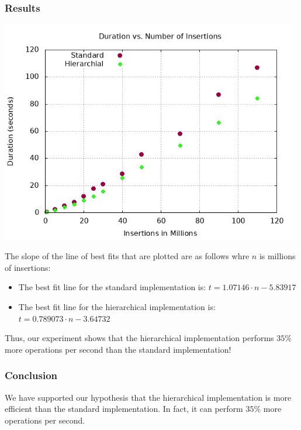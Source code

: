 \subsubsection{Results}
\begin{center}
    \includegraphics[width=13cm]{plots/scale-nm.png}
\end{center}
The slope of the line of best fits that are plotted are as follows whre $n$ is millions of insertions:
\begin{itemize}
    \item The best fit line for the standard implementation is: $t = 1.07146\cdot n - 5.83917$
    \item The best fit line for the hierarchical implementation is: $t = 0.789073\cdot n -3.64732 $
\end{itemize}
Thus, our experiment shows that the hierarchical implementation performs $35\%$ more operations per second than the standard implementation!

\subsubsection{Conclusion}
We have supported our hypothesis that the hierarchical implementation is more efficient than the standard implementation. In fact, it can perform $35\%$ more operations per second.
